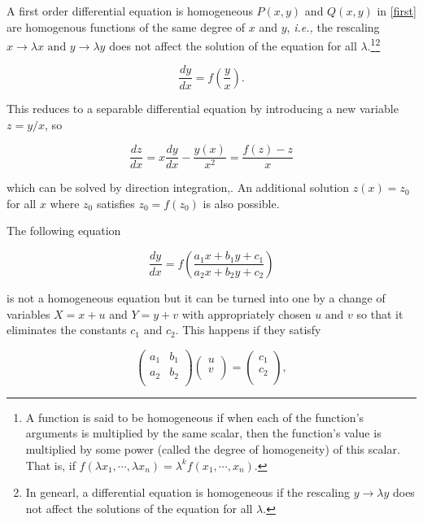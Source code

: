 \documentclass[english,a4paper,12pt]{report}
\begin{document}
A first order differential equation is homogeneous \(P(x,y)\) and \(Q(x,y)\) in \cref{first} are homogenous functions of the same degree of \(x\) and \(y\), \textit{i.e.,} the rescaling \(x \to \lambda x \text { and } y \to \lambda y\) does not affect the solution of the equation for all \(\lambda \).\footnote{A function is said to be homogeneous if when each of the function's arguments is multiplied by the same scalar, then the function's value is multiplied by some power (called the degree of homogeneity) of this scalar. That is, if \(f(\lambda x_1 ,\cdots, \lambda x_{n} ) = \lambda  ^{k} f(x_1 ,\cdots,x_{n} )  \).  }\footnote{In genearl, a differential equation is homogeneous if the rescaling \(y \to  \lambda y\) does not affect the solutions of the equation for all \(\lambda \).} 

\begin{equation}
    \frac{dy}{dx} = f\left(\frac{y}{x} \right).
\end{equation}

This reduces to a separable differential equation by introducing a new variable \( z = y /x \), so

\begin{equation}
    \frac{dz}{dx} = x\frac{dy}{dx} - \frac{y(x)}{x^2} = \frac{f(z)-z}{x}  
\end{equation}

which can be solved by direction integration,. An additional solution \(z(x) = z_0 \) for all \(x\) where \(z_0 \) satisfies \(z_0 = f(z_0 )\) is also possible.

The following equation

\begin{equation}
    \frac{dy}{dx} = f\left(\frac{a_1 x+b_1 y+c_1 }{a_2 x+b_2 y+c_2 } \right)
\end{equation}

is not a homogeneous equation but it can be turned into one by a change of variables \(X = x+u\) and \(Y = y+v\) with appropriately chosen \(u\text { and } v\) so that it eliminates the constants \(c_1 \text { and } c_2 \). This happens if they satisfy 

\begin{equation} \label{X=x+u} 
    \begin{pmatrix}
        a_1  &  b_1  \\
        a_2  &  b_2  \\
    \end{pmatrix} \begin{pmatrix}
         u \\
         v \\
    \end{pmatrix} = \begin{pmatrix}
         c_1  \\
        c_2   \\
    \end{pmatrix} ,
\end{equation}
\end{document}
